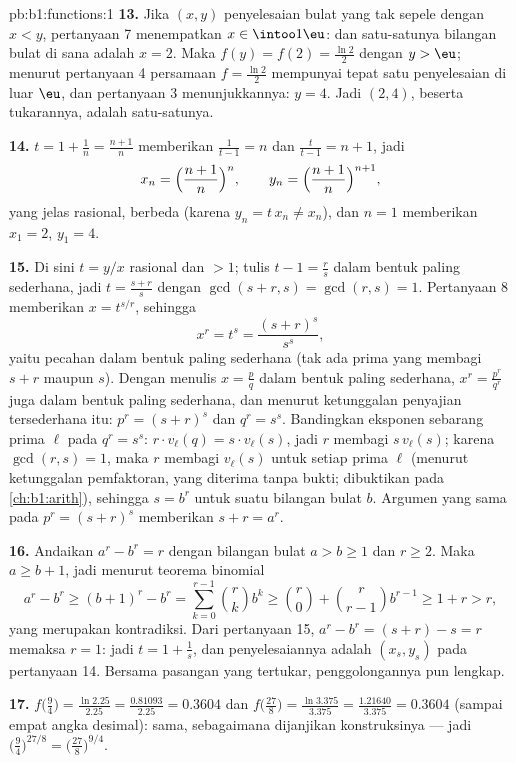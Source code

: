 \begin{solution}{pb:b1:functions:1}
\textbf{13.} Jika $(x, y)$ penyelesaian bulat yang tak sepele dengan $x
< y$, pertanyaan 7 menempatkan $x \in \intoo1\eu$: dan satu-satunya bilangan bulat
di sana adalah $x = 2$. Maka $f(y) = f(2) = \frac{\ln2}2$ dengan $y > \eu$; menurut
pertanyaan 4 persamaan $f = \frac{\ln2}2$ mempunyai tepat satu
penyelesaian di luar $\eu$, dan pertanyaan 3 menunjukkannya: $y = 4$. Jadi
$(2, 4)$, beserta tukarannya, adalah satu-satunya.

\textbf{14.} $t = 1 + \frac1n = \frac{n+1}n$ memberikan $\frac1{t - 1}
= n$ dan $\frac t{t-1} = n + 1$, jadi
\[
x_n = \Bigl(\frac{n+1}n\Bigr)^{n},
\qquad
y_n = \Bigl(\frac{n+1}n\Bigr)^{n+1},
\]
yang jelas rasional, berbeda (karena $y_n = t\,x_n \neq x_n$), dan $n =
1$ memberikan $x_1 = 2$, $y_1 = 4$.

\textbf{15.} Di sini $t = y/x$ rasional dan $> 1$; tulis $t - 1 =
\frac rs$ dalam bentuk paling sederhana, jadi $t = \frac{s + r}s$ dengan $\gcd(s +
r, s) = \gcd(r, s) = 1$. Pertanyaan 8 memberikan $x = t^{s/r}$, sehingga
\[
x^r = t^s = \frac{(s+r)^s}{s^s} ,
\]
yaitu pecahan dalam bentuk paling sederhana (tak ada prima yang membagi $s + r$ maupun
$s$). Dengan menulis $x = \frac pq$ dalam bentuk paling sederhana, $x^r = \frac{p^r}
{q^r}$ juga dalam bentuk paling sederhana, dan menurut ketunggalan penyajian
tersederhana itu: $p^r = (s+r)^s$ dan $q^r = s^s$. Bandingkan
eksponen sebarang prima $\ell$ pada $q^r = s^s$: $r \cdot
v_\ell(q) = s \cdot v_\ell(s)$, jadi $r$ membagi $s\,v_\ell(s)$;
karena $\gcd(r, s) = 1$, maka $r$ membagi $v_\ell(s)$ untuk setiap prima
$\ell$ (menurut ketunggalan pemfaktoran, yang diterima tanpa bukti; dibuktikan pada
\cref{ch:b1:arith}), sehingga $s = b^r$ untuk suatu bilangan bulat $b$. Argumen yang
sama pada $p^r = (s+r)^s$ memberikan $s + r = a^r$.

\textbf{16.} Andaikan $a^r - b^r = r$ dengan bilangan bulat $a > b \geq 1$
dan $r \geq 2$. Maka $a \geq b + 1$, jadi menurut teorema binomial
\[
a^r - b^r \geq (b+1)^r - b^r
= \sum_{k=0}^{r-1}\binom rk b^k
\geq \binom r0 + \binom r{r-1} b^{r-1}
\geq 1 + r > r ,
\]
yang merupakan kontradiksi. Dari pertanyaan 15, $a^r - b^r = (s + r) - s = r$
memaksa $r = 1$: jadi $t = 1 + \frac1s$, dan penyelesaiannya adalah $(x_s,
y_s)$ pada pertanyaan 14. Bersama pasangan yang tertukar,
penggolongannya pun lengkap.

\textbf{17.} $f\bigl(\tfrac94\bigr) = \frac{\ln 2.25}{2.25} =
\frac{0.81093}{2.25} = 0.3604$ dan $f\bigl(\tfrac{27}8\bigr) =
\frac{\ln 3.375}{3.375} = \frac{1.21640}{3.375} = 0.3604$ (sampai empat
angka desimal): sama, sebagaimana dijanjikan konstruksinya --- jadi
$\bigl(\tfrac94\bigr)^{27/8} = \bigl(\tfrac{27}8\bigr)^{9/4}$.


\end{solution}
